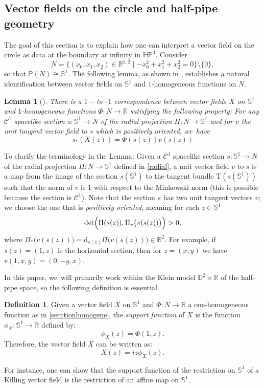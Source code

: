 \documentclass[11pt]{article}
\theoremstyle{plain}
\newtheorem{lemma}[cor]{Lemma}
\theoremstyle{definition}
\newtheorem{defi}[cor]{Definition}
\newcommand{\minko}{\mathbb{R}^{1,2}}
\newcommand{\HP}{\mathbb{HP}^3}
\begin{document}
\subsection{Vector fields on the circle and half-pipe geometry}
The goal of this section is to explain how one can interpret a vector field on the circle as data at the boundary at infinity in $\HP$. Consider
\[
N=\{(x_0,x_1,x_2)\in\minko\mid -x_0^2+x_1^2+x_2^2=0\}\setminus\{0\},\]
so that $\mathbb{P}(N)\cong\mathbb{S}^1$. The following lemma, as shown in \cite{BS17}, establishes a natural identification between vector fields on $\mathbb{S}^1$ and $1$-homogeneous functions on $N$.

\begin{lemma}[{\cite[Lem.\,2.23]{BS17}}]\label{homogene}
There is a $1-$to$-1$ correspondence between vector fields $X$ on $\mathbb{S}^1$ and $1$-homogeneous functions $\Phi:N\to\mathbb{R}$ satisfying the following property: For any $\mathcal{C}^1$ spacelike section $s:\mathbb{S}^1\to N$ of the radial projection $\Pi:N\to\mathbb{S}^1$ and for $v$ the unit tangent vector field to
$s$ which is positively oriented, we~have
\begin{equation}\label{secctionhomogene}
s_*(X(z))=\Phi(s(z))v(s(z))
\end{equation}
\end{lemma}
To clarify the terminology in the Lemma: Given a $\mathcal{C}^1$ spacelike section $s:\mathbb{S}^1\to N$ of the radial projection $\Pi:N\to\mathbb{S}^1$ defined in \eqref{radial}, a unit vector field $v$ to $s$ is a map from the image of the section $s(\mathbb{S}^1)$ to the tangent bundle $\mathrm{T}(s(\mathbb{S}^1))$ such that the norm of $v$ is $1$ with respect to the Minkowski norm (this is possible because the section is $\mathcal{C}^1$). Note that the section $s$ has two unit tangent vectors $v$; we choose the one that is \emph{positively oriented}, meaning for each $z\in \mathbb{S}^1$
\[
\det\Bigl(\Pi(s(z)),\Pi_*\bigl(v(s(z))\bigr)\Bigr)>0,
\]
where $\Pi_*\bigl(v(s(z))\bigr)=\mathrm{d}_{s(z)}\Pi\bigl(v(s(z))\bigr)\in\mathbb{R}^2$. For example, if $s(z)=(1,z)$ is the horizontal section, then for $z=(x,y)$ we have $v(1,x,y)=(0,-y,x)$.

In this paper, we~will primarily work within the Klein model $\mathbb{D}^2\times\mathbb{R}$ of the half-pipe space, so the following definition is essential.

\begin{defi}\label{supportfunction}
Given a vector field $X$ on $\mathbb{S}^1$ and $\Phi:N\to \mathbb{R}$ a one-homogeneous function as in \eqref{secctionhomogene}, the \emph{support function} of $X$ is the function $\phi_X:\mathbb{S}^1\to \mathbb{R}$ defined by:
\[
\phi_X(z)=\Phi(1,z).
\]
Therefore, the vector field $X$ can be written as: \begin{equation}\label{supportfunction_vs_vectorfield}
X(z)=iz\phi_{X}(z).
\end{equation}
\end{defi}
For instance, one can show that the support function of the restriction on $\mathbb{S}^1$ of a Killing vector field is the restriction of an affine map on $\mathbb{S}^1$.
\end{document}
